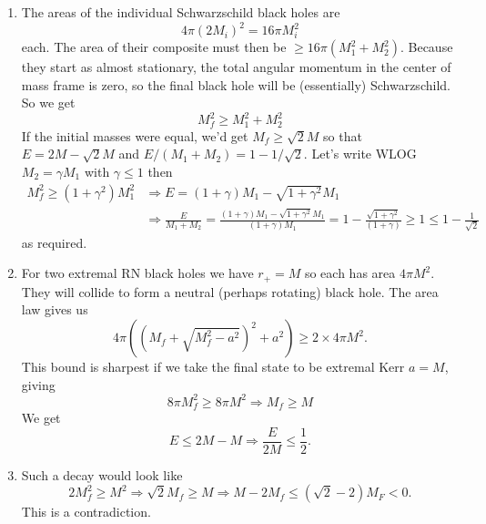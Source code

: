\documentclass[11pt, class=article, crop=false]{standalone}
\begin{document}
\begin{enumerate}
	\begin{enumerate}
		\item The areas of the individual Schwarzschild black holes are 
	\[
		4 \pi (2 M_i)^2 = 16 \pi M_i^2
	\]
	each. The area of their composite must then be $\geq 16 \pi (M_1^2 + M_2^2)$. Because they start as almost stationary, the total angular momentum in the center of mass frame is zero, so the final black hole will be (essentially) Schwarzschild. So we get 
	\[
		M_f^2 \geq M_1^2 + M_2^2
	\]
	If the initial masses were equal, we'd get $M_f \geq \sqrt{2} M$ so that $E = 2 M - \sqrt 2 M$ and $E/(M_1 + M_2) = 1- 1/\sqrt{2}$. Let's write WLOG $M_2 = \gamma M_1$ with $\gamma \leq 1$ then 
	\[
	\begin{aligned}
		M_f^2 \geq (1+\gamma^2) M_1^2  &\Rightarrow E = (1+\gamma) M_1 - \sqrt{1+\gamma^2} M_1\\ 
		&\Rightarrow \frac{E}{M_1 + M_2} = \frac{(1+\gamma) M_1 - \sqrt{1+\gamma^2} M_1}{(1+\gamma) M_1} = 1 -\frac{\sqrt{1+\gamma^2}}{(1+\gamma)} \geq 1 \leq 1 - \frac{1}{\sqrt 2}
	\end{aligned}
	\]
	as required. 
	\item For two extremal RN black holes we have $r_+ = M$ so each has area $4 \pi M^2$. They will collide to form a neutral (perhaps rotating) black hole. The area law gives us 
	\[
		4 \pi ((M_f + \sqrt{M_f^2 - a^2})^2 + a^2) \geq 2 \times 4 \pi M^2.
	\]
	This bound is sharpest if we take the final state to be extremal Kerr $a = M$, giving
	\[
		 8 \pi M_f^2 \geq 8 \pi M^2 \Rightarrow M_f \geq M
	\]
	We get 
	\[
		E \leq 2M - M \Rightarrow \frac{E}{2M} \leq \frac12.
	\]
	
	\item Such a decay would look like 
	\[
		2 M_f^2  \geq M^2 \Rightarrow \sqrt{2} M_f \geq M  \Rightarrow M - 2 M_f \leq (\sqrt{2} - 2) M_F < 0.
	\]
	This is a contradiction. 
	
	\end{enumerate}
	

\end{enumerate}
\end{document}
